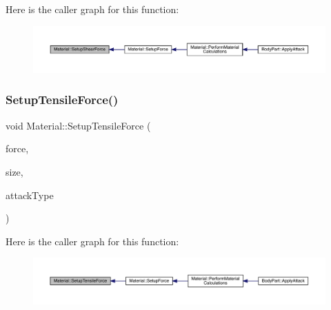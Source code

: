 Here is the caller graph for this function\+:
\nopagebreak
\begin{figure}[H]
\begin{center}
\leavevmode
\includegraphics[width=350pt]{class_material_a65d6bf35a560e97da3468e91178facdc_icgraph}
\end{center}
\end{figure}
\mbox{\label{class_material_a9d67ba42a8823f287b382ea069b7afe9}} 
\subsubsection{\texorpdfstring{Setup\+Tensile\+Force()}{SetupTensileForce()}}
{\footnotesize\ttfamily void Material\+::\+Setup\+Tensile\+Force (\begin{DoxyParamCaption}\item[{float}]{force,  }\item[{float}]{size,  }\item[{\mbox{\hyperlink{_enum_types_8hpp_a904b2f9c8f3951116c343784c59d6afe}{Attack\+Type}}}]{attack\+Type }\end{DoxyParamCaption})\hspace{0.3cm}{\ttfamily [private]}}

Here is the caller graph for this function\+:
\nopagebreak
\begin{figure}[H]
\begin{center}
\leavevmode
\includegraphics[width=350pt]{class_material_a9d67ba42a8823f287b382ea069b7afe9_icgraph}
\end{center}
\end{figure}
\mbox{\label{class_material_a767010a40d459c05e14afc641217a21b}} 
